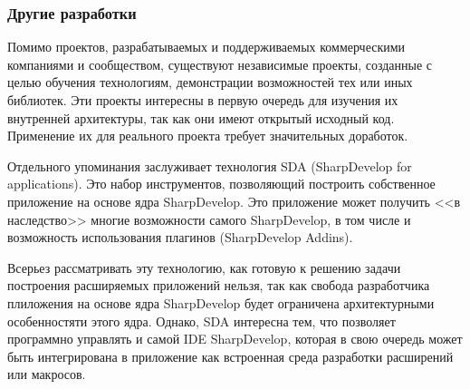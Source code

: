 \subsubsection{Другие разработки}

Помимо проектов, разрабатываемых и поддерживаемых коммерческими компаниями и сообществом, существуют независимые проекты, созданные с целью обучения технологиям, демонстрации возможностей тех или иных библиотек. Эти проекты интересны в первую очередь для изучения их внутренней архитектуры, так как они имеют открытый исходный код. Применение их для реального проекта требует значительных доработок.

Отдельного упоминания заслуживает технология SDA (SharpDevelop  for applications). Это набор инструментов, позволяющий построить собственное приложение на основе ядра SharpDevelop. Это приложение может получить <<в наследство>> многие возможности самого SharpDevelop, в том числе и возможность использования плагинов (SharpDevelop Addins).

Всерьез рассматривать эту технологию, как готовую к решению задачи построения расширяемых приложений нельзя, так как свобода разработчика плиложения на основе ядра SharpDevelop будет ограничена архитектурными особенностяти этого ядра. Однако, SDA интересна тем, что позволяет программно управлять и самой IDE SharpDevelop, которая в свою очередь может быть интегрирована в приложение как встроенная среда разработки расширений или макросов.
